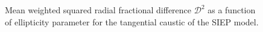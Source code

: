 \documentclass[useAMS,usenatbib]{mn2e}
\begin{document}
\begin{figure}
\begin{center}
\caption{\label{d2_siep_plot} Mean weighted squared radial fractional difference
$\mathcal{D}^2$  as a function of ellipticity parameter for the tangential
caustic of the SIEP model.}
\end{center}
\end{figure}
\end{document}
